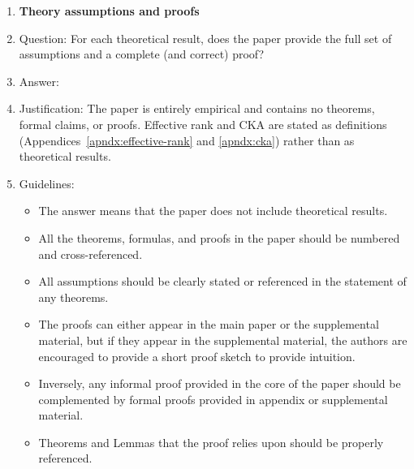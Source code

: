 \begin{enumerate}
\begin{itemize}
        \item The authors should discuss the computational efficiency of the proposed algorithms and how they scale with dataset size.
        \item If applicable, the authors should discuss possible limitations of their approach to address problems of privacy and fairness.
        \item While the authors might fear that complete honesty about limitations might be used by reviewers as grounds for rejection, a worse outcome might be that reviewers discover limitations that aren't acknowledged in the paper. The authors should use their best judgment and recognize that individual actions in favor of transparency play an important role in developing norms that preserve the integrity of the community. Reviewers will be specifically instructed to not penalize honesty concerning limitations.
    \end{itemize}

\item {\bf Theory assumptions and proofs}
    \item[] Question: For each theoretical result, does the paper provide the full set of assumptions and a complete (and correct) proof?
    \item[] Answer: \answerNA{}
    \item[] Justification: The paper is entirely empirical and contains no theorems, formal claims, or proofs. Effective rank and CKA are stated as definitions (Appendices~\ref{apndx:effective-rank} and \ref{apndx:cka}) rather than as theoretical results.
    \item[] Guidelines:
    \begin{itemize}
        \item The answer \answerNA{} means that the paper does not include theoretical results. 
        \item All the theorems, formulas, and proofs in the paper should be numbered and cross-referenced.
        \item All assumptions should be clearly stated or referenced in the statement of any theorems.
        \item The proofs can either appear in the main paper or the supplemental material, but if they appear in the supplemental material, the authors are encouraged to provide a short proof sketch to provide intuition. 
        \item Inversely, any informal proof provided in the core of the paper should be complemented by formal proofs provided in appendix or supplemental material.
        \item Theorems and Lemmas that the proof relies upon should be properly referenced. 
    \end{itemize}


\end{enumerate}

